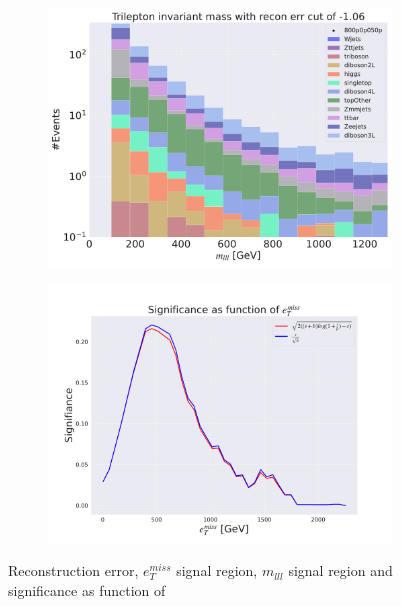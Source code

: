 \begin{figure}[H]
    \hfill
    \begin{subfigure}{.40\textwidth}
        \includegraphics[width=\textwidth]{Figures/AE_testing/small/3lep/b_data_recon_big_rm3_feats_sig_800p0p050p_mlll_recon_errcut_-1.06.pdf}
        \caption{}
        \label{fig:AE_3lep_small_mlll_800_2}
    \end{subfigure}
    \hfill   
    \begin{subfigure}{.40\textwidth}
        \includegraphics[width=\textwidth]{Figures/AE_testing/small/3lep/significance_etmiss_800p0p050p_-1.0567039801896674.pdf}
        \caption{}
        \label{fig:AE_3lep_small_signi_800_2}
    \end{subfigure}
    \hfill      
    \caption[3lep shallow network | $800p50$ | AE | 2]{Reconstruction error, $e_T^{miss}$ signal region, $m_{lll}$ signal region and significance as function of 
}
\end{figure}
